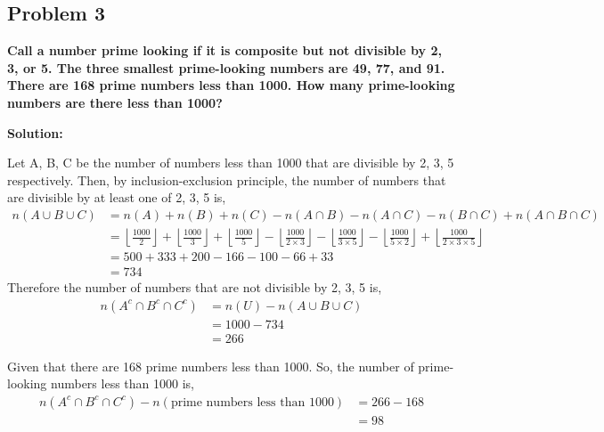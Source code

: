 \subsection{Problem 3}
\textbf{Call a number prime looking if it is composite but not divisible by 2, 3, or 5. The three smallest prime-looking numbers are 49, 77, and 91. There are 168 prime numbers less than 1000. How many
prime-looking numbers are there less than 1000?}
\par

\begin{flushleft}
\textbf{Solution: }
\par
Let A, B, C be the number of numbers less than 1000 that are divisible by 2, 3, 5 respectively. 
Then, by inclusion-exclusion principle, the number of numbers that are divisible by at least one of 2, 3, 5 is,
$$
\begin{aligned}
    n(A \cup B \cup C) & = n(A) + n(B) + n(C) - n(A \cap B) - n(A \cap C) - n(B \cap C) + n(A \cap B \cap C) \\ 
    & = \left\lfloor \frac{1000}{2} \right\rfloor + \left\lfloor \frac{1000}{3} \right\rfloor + \left\lfloor \frac{1000}{5} \right\rfloor - \left\lfloor \frac{1000}{2 \times 3} \right\rfloor - \left\lfloor \frac{1000}{3 \times 5} \right\rfloor - \left\lfloor \frac{1000}{5 \times 2} \right\rfloor + \left\lfloor \frac{1000}{2 \times 3 \times 5} \right\rfloor \\
    & = 500 + 333 + 200 - 166 - 100 - 66 + 33 \\
    & = 734
\end{aligned}
$$
Therefore the number of numbers that are not divisible by 2, 3, 5 is,
$$
\begin{aligned}
    n(A^c \cap B^c \cap C^c) & = n(U) - n(A \cup B \cup C) \\
    & = 1000 - 734 \\
    & = 266
\end{aligned}
$$

Given that there are 168 prime numbers less than 1000. So, the number of prime-looking numbers less than 1000 is,
$$
\begin{aligned}
    n(A^c \cap B^c \cap C^c) - n(\text{prime numbers less than 1000}) & = 266 - 168 \\
    & = 98
\end{aligned}
$$

\end{flushleft}